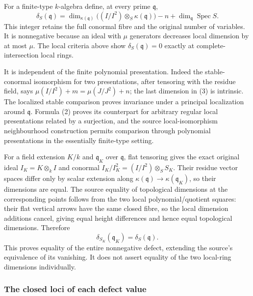 For a finite-type \(k\)-algebra define, at every prime \(\mathfrak q\), \[
\delta_S(\mathfrak q)=
\dim_{\kappa(\mathfrak q)}\big((I/I^2)\otimes_S\kappa(\mathfrak q)\big)
-n+\dim_{\mathfrak q}\operatorname{Spec}S.\tag{3}
\] This integer retains the full conormal fibre and the original number of variables. It is nonnegative because an ideal with \(\mu\) generators decreases local dimension by at most \(\mu\). The local criteria above show \(\delta_S(\mathfrak q)=0\) exactly at complete-intersection local rings.

It is independent of the finite polynomial presentation. Indeed the stable-conormal isomorphism for two presentations, after tensoring with the residue field, says \(\mu(I/I^2)+m=\mu(J/J^2)+n\); the last dimension in (3) is intrinsic. The localized stable comparison proves invariance under a principal localization around \(\mathfrak q\). Formula (2) proves its counterpart for arbitrary regular local presentations related by a surjection, and the source local-isomorphism neighbourhood construction permits comparison through polynomial presentations in the essentially finite-type setting.

For a field extension \(K/k\) and \(\mathfrak q_K\) over \(\mathfrak q\), flat tensoring gives the exact original ideal \(I_K=K\otimes_k I\) and conormal \(I_K/I_K^2=(I/I^2)\otimes_S S_K\). Their residue vector spaces differ only by scalar extension along \(\kappa(\mathfrak q)\to\kappa(\mathfrak q_K)\), so their dimensions are equal. The source equality of topological dimensions at the corresponding points follows from the two local polynomial/quotient squares: their flat vertical arrows have the same closed fibre, so the local dimension additions cancel, giving equal height differences and hence equal topological dimensions. Therefore \[
\delta_{S_K}(\mathfrak q_K)=\delta_S(\mathfrak q).\tag{4}
\] This proves equality of the entire nonnegative defect, extending the source's equivalence of its vanishing. It does not assert equality of the two local-ring dimensions individually.

\subsubsection{The closed loci of each defect value}\label{the-closed-loci-of-each-defect-value}


